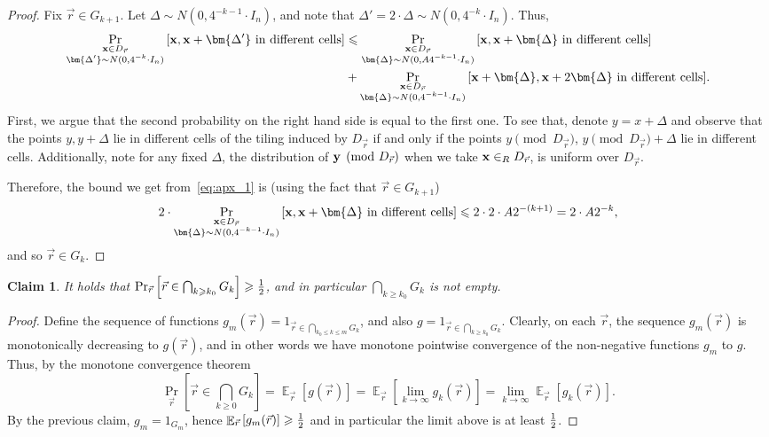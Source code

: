 \documentclass[10pt,a4paper]{article}
\newtheorem{claim}[thm]{Claim}
\newcommand\Prob[2]{{\Pr_{#1}\left[ {#2} \right]}}
\newcommand\Expect[2]{{\mathop{\mathbb{E}}_{#1}\left[ {#2} \right]}}
\newcommand\half{{1\over2}}
\renewcommand\geq{\geqslant}
\renewcommand\leq{\leqslant}
\newcommand{\De}{\Delta}
\begin{document}
    \begin{proof}
      Fix $\vec{r}\in G_{k+1}$. Let $\De\sim N(0,4^{-k-1}\cdot I_n)$, and note that $\De' = 2\cdot\De\sim N(0,4^{-k}\cdot I_n)$.
      Thus,
      \begin{align}
      \Prob{\substack{{\bf x}\in D_{\vec{r}}\\ \bm{\De'}\sim N(0,4^{-k}\cdot I_n)}}{{\bf x},{\bf x}+\bm{\De'}\text{ in different cells}}
      &\leq \Prob{\substack{{\bf x}\in D_{\vec{r}}\\ \bm{\De}\sim N(0,A 4^{-k-1}\cdot I_n)}}{{\bf x},{\bf x}+\bm{\De}\text{ in different cells}}\notag\\\label{eq:apx_1}
      &+\Prob{\substack{{\bf x}\in D_{\vec{r}}\\ \bm{\De}\sim N(0,4^{-k-1}\cdot I_n)}}{{\bf x}+\bm{\De},{\bf x}+2\bm{\De}\text{ in different cells}}.
      \end{align}
      First, we argue that the second probability on the right hand side is equal to the first one. To see that,
      denote $y = x+\De$ and observe that
      the points $y,y+\De$ lie in different cells of the tiling induced by $D_{\vec{r}}$ if and only if the points
      $y\pmod{D_{\vec{r}}}$, $y\pmod{D_{\vec{r}}} + \De$ lie in different cells. Additionally, note for any fixed $\De$,
      the distribution of ${\bf y}\pmod{D_{\vec{r}}}$ when we take ${\bf x}\in_R D_{\vec{r}}$, is uniform over $D_{\vec{r}}$.

      Therefore, the bound we get from~\eqref{eq:apx_1} is (using the fact that $\vec{r}\in G_{k+1}$)
      \[
      2\cdot \Prob{\substack{{\bf x}\in D_{\vec{r}}\\ \bm{\De}\sim N(0,4^{-k-1}\cdot I_n)}}{{\bf x},{\bf x}+\bm{\De}\text{ in different cells}}\leq
      2\cdot 2\cdot A 2^{-(k+1)}
      = 2\cdot A 2^{-k},
      \]
      and so $\vec{r}\in G_{k}$.
    \end{proof}

    \begin{claim}\label{claim:plenty_of_tilings}
      It holds that $\Prob{\vec{r}}{\vec{r}\in \bigcap_{k\geq k_0} G_k}\geq \half$, and in particular $\bigcap_{k\geq k_0} G_k$
      is not empty.
    \end{claim}
    \begin{proof}
      Define the sequence of functions $g_m(\vec{r}) = \mathrm{1}_{\vec{r}\in \bigcap_{k_0\leq k\leq m} G_k}$,
      and also $g = \mathrm{1}_{\vec{r}\in \bigcap_{k\geq k_0} G_k}$. Clearly, on each $\vec{r}$, the sequence $g_m(\vec{r})$
      is monotonically decreasing to $g(\vec{r})$, and in other words we have monotone pointwise convergence of
      the non-negative functions $g_m$ to $g$.
      Thus, by the monotone convergence theorem
      \[
      \Prob{\vec{r}}{\vec{r}\in \bigcap_{k\geq 0} G_k}
      = \Expect{\vec{r}}{g(\vec{r})}
      = \Expect{\vec{r}}{\lim_{k\rightarrow\infty} g_k(\vec{r})}
      = \lim_{k\rightarrow\infty} \Expect{\vec{r}}{g_k(\vec{r})}.
      \]
      By the previous claim, $g_m = \mathrm{1}_{G_m}$, hence $\Expect{\vec{r}}{g_m(\vec{r})}\geq \half$
      and in particular the limit above is at least $\half$.
    \end{proof}
\end{document}

